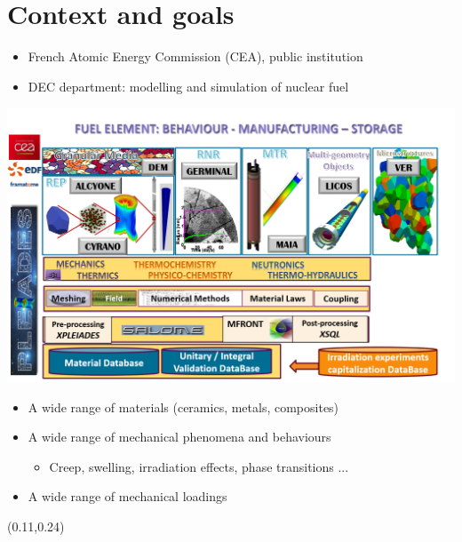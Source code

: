 \documentclass{beamer}
\begin{document}
\PageTitre{}

\begin{frame}[fragile]
  \begin{flushleft}
    {\tiny
      \tableofcontents[hideallsubsections]
    }
  \end{flushleft}
\end{frame}

\section{Context and goals}

\begin{frame}[fragile]
  \begin{itemize}
    \item French Atomic Energy Commission (CEA), public institution
    \item DEC department: modelling and simulation of nuclear fuel
  \end{itemize}
  \begin{center}
    \includegraphics[trim = .2cm .2cm .2cm .6cm,clip,width=0.60\linewidth]{img/PLEIADES_2019_en.png}
    \vspace*{-3mm}
  \end{center}
  \begin{itemize}
    \item A wide range of materials (ceramics, metals, composites)
    \item A wide range of mechanical phenomena and behaviours
    \begin{itemize}
      \item Creep, swelling, irradiation effects, phase transitions ...
    \end{itemize}
    \item A wide range of mechanical loadings
  \end{itemize}

\begin{textblock}{.40}(0.11,0.24)
\end{textblock}


\end{frame}
\end{document}
